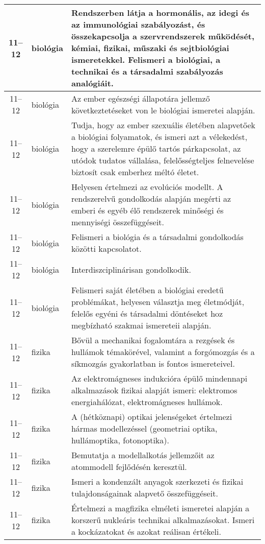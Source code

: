 \begin{small}
\begin{longtable}{c | p{2cm} |  p{11cm} }
              11--12 & biológia & Rendszerben látja a hormonális, az idegi és az immunológiai szabályozást, és összekapcsolja a szervrendszerek működését, kémiai, fizikai, műszaki és sejtbiológiai ismeretekkel. Felismeri a biológiai, a technikai és a társadalmi szabályozás analógiáit. \\ \hline
              11--12 & biológia & Az ember egészségi állapotára jellemző következtetéseket von le biológiai ismeretei alapján. \\ \hline
              11--12 & biológia & Tudja, hogy az ember szexuális életében alapvetőek a biológiai folyamatok, és ismeri azt a vélekedést, hogy a szerelemre épülő tartós párkapcsolat, az utódok tudatos vállalása, felelősségteljes felnevelése biztosít csak emberhez méltó életet. \\ \hline
              11--12 & biológia & Helyesen értelmezi az evolúciós modellt. A rendszerelvű gondolkodás alapján megérti az emberi és egyéb élő rendszerek minőségi és mennyiségi összefüggéseit. \\ \hline
              11--12 & biológia & Felismeri a biológia és a társadalmi gondolkodás közötti kapcsolatot. \\ \hline
              11--12 & biológia & Interdiszciplinárisan gondolkodik. \\ \hline
              11--12 & biológia & Felismeri saját életében a biológiai eredetű problémákat, helyesen választja meg életmódját, felelős egyéni és társadalmi döntéseket hoz megbízható szakmai ismereteii alapján. \\ \hline
              11--12 & fizika & Bővül a mechanikai fogalomtára a rezgések és hullámok témakörével, valamint a forgómozgás és a síkmozgás gyakorlatban is fontos ismereteivel. \\ \hline
              11--12 & fizika & Az elektromágneses indukcióra épülő mindennapi alkalmazások fizikai alapját ismeri: elektromos energiahálózat, elektromágneses hullámok. \\ \hline
              11--12 & fizika & A (hétköznapi) optikai jelenségeket értelmezi hármas modellezéssel (geometriai optika, hullámoptika, fotonoptika). \\ \hline
              11--12 & fizika & Bemutatja a modellalkotás jellemzőit az atommodell fejlődésén keresztül. \\ \hline
              11--12 & fizika & Ismeri a kondenzált anyagok szerkezeti és fizikai tulajdonságainak alapvető összefüggéseit. \\ \hline
              11--12 & fizika & Értelmezi a magfizika elméleti ismeretei alapján a korszerű nukleáris technikai alkalmazásokat. Ismeri a kockázatokat és azokat reálisan értékeli. \\ \hline

\end{longtable}
\end{small}
